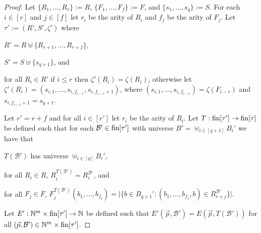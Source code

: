\documentclass[../main/thesis.tex]{subfiles}
\begin{document}
\begin{proof}
  Let $\{R_1, \ldots, R_{r}\} := R$, $\{ F_1, \ldots, F_{f} \} := F$, and
  $\{s_1, \ldots, s_{q}\} := S$. For each $i \in [r]$ and $j \in [f]$ let $r_i$
  be the arity of $R_i$ and $f_j$ be the arity of $F_j$. Let $\tau' := (R', S',
  \zeta')$ where
  \begin{myitemize}
  \item $R' = R \uplus \{R_{r + 1}, \ldots, R_{r + f}\}$,
  \item $S' = S \uplus \{s_{q+1}\}$, and
  \item for all $R_i \in R'$ if $i \leq r$ then $\zeta' (R_i) = \zeta(R_i)$,
    otherwise let $\zeta'(R_{i}) = (s_{i, 1}, \ldots, s_{i, f_{i - r}}, s_{i,
      f_{i - r} + 1})$, where $(s_{i, 1}, \ldots, s_{i, f_{i -r}}) = \zeta(F_{i
      - r})$ and $s_{i, f_{i - r}+1} = s_{q+1}$.
  \end{myitemize}
  Let $r' = r + f$ and for all $i \in [r']$ let $r_i$ be the arity of $R_i$. Let
  $T : \text{\upshape fin}{[\tau']} \rightarrow \text{\upshape fin}{[\tau]}$ be defined such that for each $\mathcal{B}'
  \in \text{\upshape fin}{[\tau']}$ with universe $B' = \uplus_{i \in [q + 1]}B_i'$ we have that
  \begin{myitemize}
  \item $T(\mathcal{B}')$ has universe $\uplus_{i \in [q]}B_i'$,
  \item for all $R_i \in R$, $R^{T(\mathcal{B}')}_i = R^{\mathcal{B}'}_i$, and
  \item for all $F_j \in F$, $F^{T(\mathcal{B}')}_j(b_1, \ldots, b_{f_j}) =
    \vert \{ b \in B_{q+1}': (b_1, \ldots, b_{f_j}, b) \in R^{\mathcal{B}'}_{r +
      j}\} \vert$.
  \end{myitemize}
  Let $E': \mathbb{N}^m \times \text{\upshape fin}{[\tau']} \rightarrow \mathbb{N}$ be defined such that
  $E'(\vec{p}, \mathcal{B}') = E(\vec{p}, T(\mathcal{B}'))$ for all $(\vec{p},
  \mathcal{B}') \in \mathbb{N}^m \times \text{\upshape fin}{[\tau']}$.



\end{proof}
\end{document}

